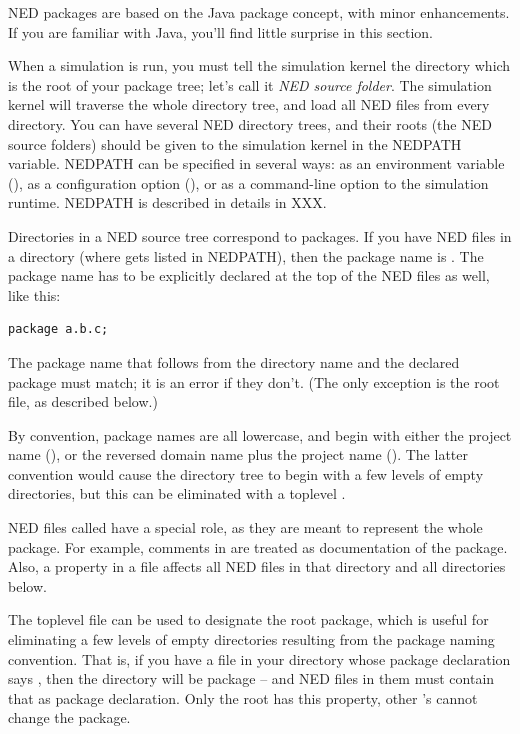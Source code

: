 \begin{note}
    NED packages are based on the Java package concept, with minor
    enhancements. If you are familiar with Java, you'll find little
    surprise in this section.
\end{note}

When a simulation is run, you must tell the simulation kernel the
directory which is the root of your package tree; let's call it
\textit{NED source folder}. The simulation kernel will traverse
the whole directory tree, and load all NED files from every directory.
You can have several NED directory trees, and their roots (the NED source
folders) should be given to the simulation kernel in the NEDPATH
variable. NEDPATH can be specified in several ways: as an environment
variable (), as a configuration option (),
or as a command-line option to the simulation runtime. NEDPATH is
described in details in XXX.

Directories in a NED source tree correspond to packages. If you have
NED files in a  directory (where 
gets listed in NEDPATH), then the package name is .
The package name has to be explicitly declared at the top of the NED
files as well, like this:

\begin{Verbatim}
package a.b.c;
\end{Verbatim}

The package name that follows from the directory name and the declared
package must match; it is an error if they don't. (The only exception
is the root  file, as described below.)

By convention, package names are all lowercase, and begin with either
the project name (), or the reversed domain name plus the
project name (). The latter convention
would cause the directory tree to begin with a few levels of empty
directories, but this can be eliminated with a toplevel .

NED files called  have a special role, as they are meant
to represent the whole package. For example, comments in
 are treated as documentation of the package. Also, a
 property in a  file affects all NED
files in that directory and all directories below.

The toplevel  file can be used to designate the root
package, which is useful for eliminating a few levels of empty directories
resulting from the package naming convention. That is, if you have a
 file in your  directory whose package
declaration says , then the 
directory will be package  -- and NED
files in them must contain that as package declaration. Only the root
 has this property, other 's cannot
change the package.

